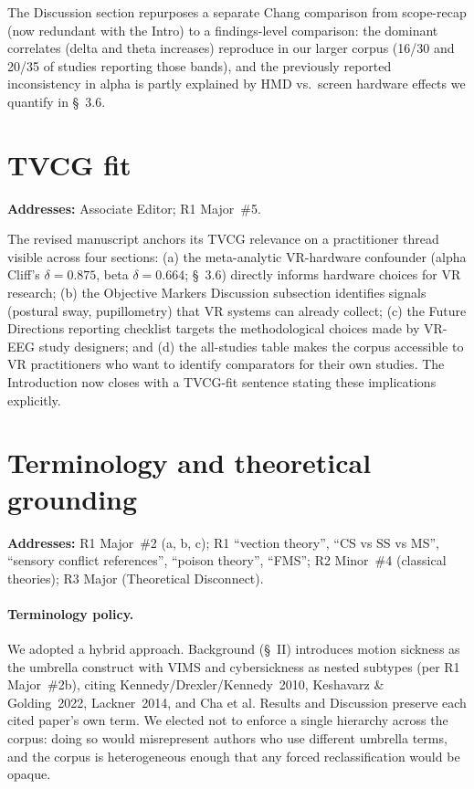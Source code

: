 \documentclass[11pt,a4paper]{article}
\newcommand{\addresses}[1]{\par\noindent\textbf{\small Addresses:} {\small #1}\par\smallskip}
\begin{document}
\noindent The Discussion section repurposes a separate Chang comparison from scope-recap (now redundant with the Intro) to a findings-level comparison: the dominant correlates (delta and theta increases) reproduce in our larger corpus (16/30 and 20/35 of studies reporting those bands), and the previously reported inconsistency in alpha is partly explained by HMD vs.\ screen hardware effects we quantify in \S~3.6.

\section{TVCG fit}\label{sec:tvcg}
\addresses{Associate Editor; R1 Major~\#5.}

The revised manuscript anchors its TVCG relevance on a practitioner thread visible across four sections: (a) the meta-analytic VR-hardware confounder (alpha Cliff's $\delta = 0.875$, beta $\delta = 0.664$; \S~3.6) directly informs hardware choices for VR research; (b) the Objective Markers Discussion subsection identifies signals (postural sway, pupillometry) that VR systems can already collect; (c) the Future Directions reporting checklist targets the methodological choices made by VR-EEG study designers; and (d) the all-studies table makes the corpus accessible to VR practitioners who want to identify comparators for their own studies. The Introduction now closes with a TVCG-fit sentence stating these implications explicitly.

\section{Terminology and theoretical grounding}\label{sec:theory}
\addresses{R1 Major~\#2 (a, b, c); R1 ``vection theory'', ``CS vs SS vs MS'', ``sensory conflict references'', ``poison theory'', ``FMS''; R2 Minor~\#4 (classical theories); R3 Major (Theoretical Disconnect).}

\paragraph{Terminology policy.} We adopted a hybrid approach. Background (\S~II) introduces motion sickness as the umbrella construct with VIMS and cybersickness as nested subtypes (per R1 Major~\#2b), citing Kennedy/Drexler/Kennedy~2010, Keshavarz \& Golding~2022, Lackner~2014, and Cha et al. Results and Discussion preserve each cited paper's own term. We elected not to enforce a single hierarchy across the corpus: doing so would misrepresent authors who use different umbrella terms, and the corpus is heterogeneous enough that any forced reclassification would be opaque.
\end{document}
